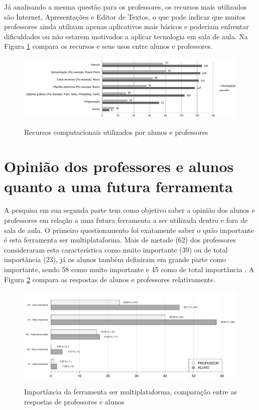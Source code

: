 Já analisando a mesma questão para os professores, os recursos mais utilizados são Internet, Apresentações e Editor de Textos, o que pode indicar que muitos professores ainda utilizam apenas aplicativos mais básicos e poderiam enfrentar dificuldades ou não estarem motivados a aplicar tecnologia em sala de aula. Na Figura \ref{fig:grafico_recursos} compara os recursos e seus usos entre alunos e professores.

\begin{figure}[!h]
\centering
\caption{Recursos computacionais utilizados por alunos e professores}
\includegraphics[width=1.0\textwidth]{pdfs/alunos-professores/recursos-computacionais.pdf} 
\label{fig:grafico_recursos} 
\end{figure}





\section{Opinião dos professores e alunos quanto a uma futura ferramenta}

A pesquisa em sua segunda parte tem como objetivo saber a opinião dos alunos e professores em relação a uma futura ferramenta a ser utilizada dentro e fora de sala de aula. O primeiro questionamento foi exatamente saber o quão importante é esta ferramenta ser multiplataforma. Mais de metade (62) dos professores consideraram esta característica como muito importante (39) ou de total importância (23), já os alunos também definiram em grande parte como importante, sendo 58 como muito importante e 45 como de total importância . A Figura \ref{fig:grafico_multiplataforma} compara as respostas de alunos e professores relativamente. 

\begin{figure}[!h]
\centering
\caption{Importância da ferramenta ser multiplataforma, comparação entre as respostas de professores e alunos}
\includegraphics[width=1.0\textwidth]{pdfs/alunos-professores/funcionalidades-multiplataforma2.pdf} 
\label{fig:grafico_multiplataforma} 
\end{figure}

